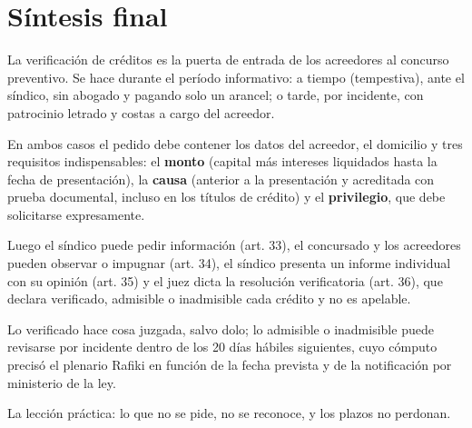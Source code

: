 \documentclass[12pt,oneside]{book}
\begin{document}
\chapter*{Síntesis final}

La verificación de créditos es la puerta de entrada de los acreedores al concurso preventivo. Se hace durante el período informativo: a tiempo (tempestiva), ante el síndico, sin abogado y pagando solo un arancel; o tarde, por incidente, con patrocinio letrado y costas a cargo del acreedor.

En ambos casos el pedido debe contener los datos del acreedor, el domicilio y tres requisitos indispensables: el \textbf{monto} (capital más intereses liquidados hasta la fecha de presentación), la \textbf{causa} (anterior a la presentación y acreditada con prueba documental, incluso en los títulos de crédito) y el \textbf{privilegio}, que debe solicitarse expresamente.

Luego el síndico puede pedir información (art. 33), el concursado y los acreedores pueden observar o impugnar (art. 34), el síndico presenta un informe individual con su opinión (art. 35) y el juez dicta la resolución verificatoria (art. 36), que declara verificado, admisible o inadmisible cada crédito y no es apelable.

Lo verificado hace cosa juzgada, salvo dolo; lo admisible o inadmisible puede revisarse por incidente dentro de los 20 días hábiles siguientes, cuyo cómputo precisó el plenario Rafiki en función de la fecha prevista y de la notificación por ministerio de la ley.

\begin{important}
La lección práctica: lo que no se pide, no se reconoce, y los plazos no perdonan.
\end{important}
\end{document}
